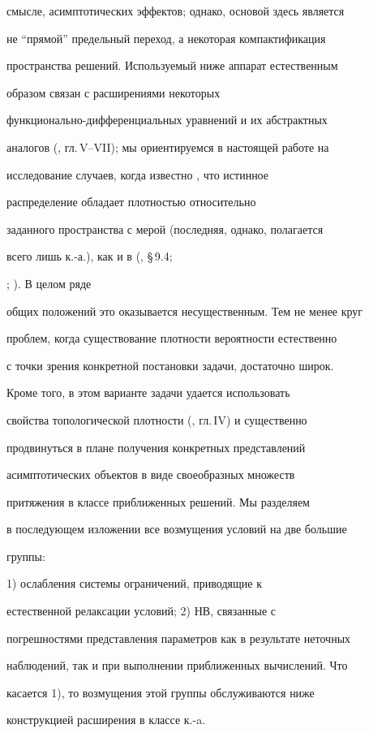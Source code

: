 смысле, асимптотических эффектов; однако, основой здесь является


не ``прямой'' предельный переход, а некоторая компактификация


пространства решений. Используемый ниже аппарат естественным


образом связан с расширениями некоторых


функционально-дифференциальных уравнений и их абстрактных


аналогов (\cite{Ch1}, гл.\,V--VII); мы ориентируемся в настоящей работе на


исследование случаев, когда известно , что истинное


распределение обладает плотностью относительно


заданного пространства с мерой (последняя, однако, полагается


всего лишь к.-а.), как и в (\cite{Ch1}, \S\,9.4;


\cite{Ch2}; \cite{Ch3}). В целом ряде


общих положений это оказывается несущественным. Тем не менее круг


проблем, когда существование плотности вероятности естественно


с точки зрения конкретной постановки задачи, достаточно широк.


Кроме того, в этом варианте задачи удается использовать


свойства топологической плотности (\cite{Ch1}, гл.\,IV) и существенно


продвинуться в плане получения конкретных представлений


асимптотических объектов в виде своеобразных множеств


притяжения в классе приближенных решений. Мы разделяем


в последующем изложении все возмущения условий на две большие


группы:\linebreak


1) ослабления системы ограничений, приводящие к


естественной релаксации условий; 2) НВ, связанные с


погрешностями представления параметров как в результате неточных


наблюдений, так и при выполнении приближенных вычислений. Что


касается 1), то возмущения этой группы обслуживаются ниже


конструкцией расширения в классе к.-a.


